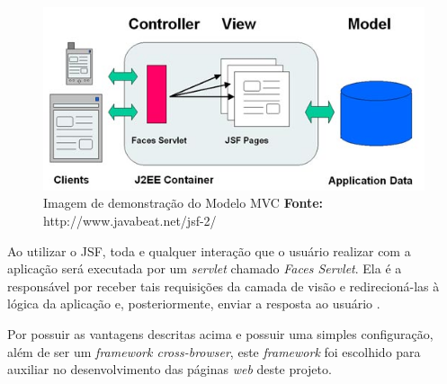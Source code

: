 \begin{figure}[h!]
	\centerline{\includegraphics[scale=0.5]{./imagens/jsf_using_mvc.jpg}}
	\caption[Imagem de demonstração do Modelo MVC]
	{Imagem de demonstração do Modelo MVC \textbf{Fonte:} http://www.javabeat.net/jsf-2/}
	\label{fig:exemplo1}
\end{figure}

\par Ao utilizar o JSF, toda e qualquer interação que o usuário realizar com a aplicação será executada por um \textit{servlet} chamado \textit{Faces Servlet}. Ela é a responsável por receber tais requisições da camada de visão e redirecioná-las à lógica da aplicação e, posteriormente, enviar a resposta ao usuário \cite{faria_java_ee_7_jsf_primefaces_cdi}.

\par Por possuir as vantagens descritas acima e possuir uma simples configuração, além de ser um \textit{framework cross-browser\footnotemark[19]}, este \textit{framework} foi escolhido para auxiliar no desenvolvimento das páginas \textit{web} deste projeto.

